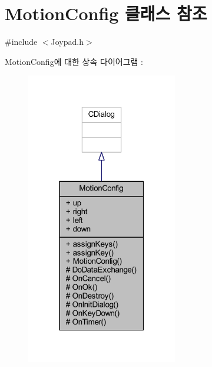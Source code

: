 \hypertarget{class_motion_config}{}\section{Motion\+Config 클래스 참조}
\label{class_motion_config}


{\ttfamily \#include $<$Joypad.\+h$>$}



Motion\+Config에 대한 상속 다이어그램 \+: \nopagebreak
\begin{figure}[H]
\begin{center}
\leavevmode
\includegraphics[width=187pt]{class_motion_config__inherit__graph}
\end{center}
\end{figure}


